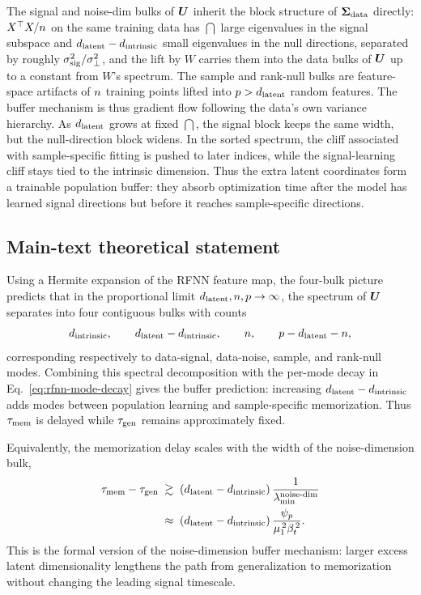 The signal and noise-dim bulks of $\bm{U}$ inherit the block
structure of $\bm{\Sigma}_{\mathrm{data}}$ directly: $X^\top X / n$ on the same
training data has $\dint$ large eigenvalues in the signal subspace
and $d_{\mathrm{latent}} - d_{\mathrm{intrinsic}}$ small eigenvalues in the null directions,
separated by roughly $\sigma_{\mathrm{sig}}^2 / \sigma_{\perp}^2$, and the lift by $W$
carries them into the data bulks of $\bm{U}$ up to a constant from
$W$'s spectrum. The sample and rank-null bulks are feature-space
artifacts of $n$ training points lifted into
$p > d_{\mathrm{latent}}$ random features. The buffer mechanism is thus
gradient flow following the data's own variance hierarchy. As
$d_{\mathrm{latent}}$ grows at fixed $\dint$, the signal block keeps the same
width, but the null-direction block widens. In the sorted spectrum,
the cliff associated with sample-specific fitting is pushed to later
indices, while the signal-learning cliff stays tied to the intrinsic
dimension. Thus the extra latent coordinates form a trainable
population buffer: they absorb optimization time after the model has
learned signal directions but before it reaches sample-specific
directions.

\subsection{Main-text theoretical statement}
\label{app:rfnn-theoretical-statement}

Using a Hermite expansion of the RFNN feature map, the four-bulk
picture predicts that in the proportional limit
$d_{\mathrm{latent}}, n, p \to \infty$, the spectrum of $\bm{U}$
separates into four contiguous bulks with counts
\[
  d_{\mathrm{intrinsic}},\qquad d_{\mathrm{latent}}-d_{\mathrm{intrinsic}},\qquad n,\qquad p-d_{\mathrm{latent}}-n,
\]
corresponding respectively to data-signal, data-noise, sample, and
rank-null modes. Combining this spectral decomposition with the
per-mode decay in Eq.~\eqref{eq:rfnn-mode-decay} gives the buffer
prediction: increasing $d_{\mathrm{latent}}-d_{\mathrm{intrinsic}}$ adds modes between population
learning and sample-specific memorization. Thus $\tau_{\mathrm{mem}}$ is delayed
while $\tau_{\mathrm{gen}}$ remains approximately fixed.

Equivalently, the memorization delay scales with the width of the
noise-dimension bulk,
\begin{equation}
\begin{aligned}
  \tau_{\mathrm{mem}} - \tau_{\mathrm{gen}}
  &\;\gtrsim\; (d_{\mathrm{latent}} - d_{\mathrm{intrinsic}})\,
    \frac{1}{\lambda_{\min}^{\mathrm{noise\text{-}dim}}} \\
  &\;\approx\; (d_{\mathrm{latent}} - d_{\mathrm{intrinsic}})\,
    \frac{\psi_p}{\mu_1^{\,2}\beta_t^{\,2}} .
\end{aligned}
\label{eq:buffer-bound}
\end{equation}
This is the formal version of the noise-dimension buffer mechanism:
larger excess latent dimensionality lengthens the path from
generalization to memorization without changing the leading signal
timescale.

